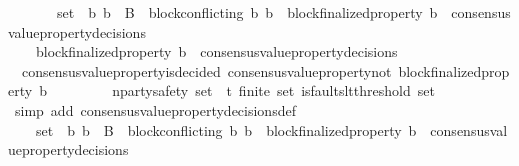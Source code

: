 \begin{isabellebody}
\ \ \ \ {\isachardoublequoteopen}{\isacharbraceleft}{\isasymsigma}{\isacharcomma}\ {\isasymsigma}{\isacharprime}{\isacharbraceright}\ {\isasymsubseteq}\ {\isasymsigma}{\isacharunderscore}set\ {\isasymand}\ {\isacharbraceleft}b{}{\isacharcomma}\ b{}{\isacharbraceright}\ {\isasymsubseteq}\ B\ {\isasymand}\ block{\isacharunderscore}conflicting\ {\isacharparenleft}b{}{\isacharcomma}\ b{}{\isacharparenright}\ {\isasymand}\ block{\isacharunderscore}finalized{\isacharunderscore}property\ b{}\ {\isasymin}\ consensus{\isacharunderscore}value{\isacharunderscore}property{\isacharunderscore}decisions\ {\isasymsigma}{\isachardoublequoteclose}\ \isanewline
\ \ \ \ {\isachardoublequoteopen}block{\isacharunderscore}finalized{\isacharunderscore}property\ b{}\ {\isasymin}\ consensus{\isacharunderscore}value{\isacharunderscore}property{\isacharunderscore}decisions\ {\isasymsigma}{\isacharprime}{\isachardoublequoteclose}\ \isanewline
\ \ \ \isamarkupfalse%
\ {\isachardoublequoteopen}{\isasymnot}\ consensus{\isacharunderscore}value{\isacharunderscore}property{\isacharunderscore}is{\isacharunderscore}decided\ {\isacharparenleft}consensus{\isacharunderscore}value{\isacharunderscore}property{\isacharunderscore}not\ {\isacharparenleft}block{\isacharunderscore}finalized{\isacharunderscore}property\ b{}{\isacharparenright}{\isacharcomma}\ {\isasymsigma}{\isacharprime}{\isacharparenright}{\isachardoublequoteclose}\isanewline
\ \ \ \ \ \ \isamarkupfalse%
\ n{\isacharunderscore}party{\isacharunderscore}safety\ {\isacartoucheopen}{\isasymsigma}{\isacharunderscore}set\ {\isasymsubseteq}\ {\isasymSigma}t{\isacartoucheclose}\ {\isacartoucheopen}finite\ {\isasymsigma}{\isacharunderscore}set{\isacartoucheclose}\ {\isacartoucheopen}is{\isacharunderscore}faults{\isacharunderscore}lt{\isacharunderscore}threshold\ {\isacharparenleft}{\isasymUnion}{\isasymsigma}{\isacharunderscore}set{\isacharparenright}{\isacartoucheclose}\ \isamarkupfalse%
\ {\isacharparenleft}simp\ add{\isacharcolon}\ consensus{\isacharunderscore}value{\isacharunderscore}property{\isacharunderscore}decisions{\isacharunderscore}def{\isacharparenright}\ \isanewline
\ \ \ \ \ \ \isamarkupfalse%
\ {\isacartoucheopen}{\isacharbraceleft}{\isasymsigma}{\isacharcomma}\ {\isasymsigma}{\isacharprime}{\isacharbraceright}\ {\isasymsubseteq}\ {\isasymsigma}{\isacharunderscore}set\ {\isasymand}\ {\isacharbraceleft}b{}{\isacharcomma}\ b{}{\isacharbraceright}\ {\isasymsubseteq}\ B\ {\isasymand}\ block{\isacharunderscore}conflicting\ {\isacharparenleft}b{}{\isacharcomma}\ b{}{\isacharparenright}\ {\isasymand}\ block{\isacharunderscore}finalized{\isacharunderscore}property\ b{}\ {\isasymin}\ consensus{\isacharunderscore}value{\isacharunderscore}property{\isacharunderscore}decisions\ {\isasymsigma}{\isacartoucheclose}\ \isamarkupfalse%

\end{isabellebody}
